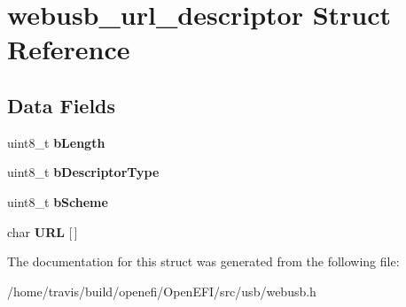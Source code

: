 \hypertarget{structwebusb__url__descriptor}{}\section{webusb\+\_\+url\+\_\+descriptor Struct Reference}
\label{structwebusb__url__descriptor}
\subsection*{Data Fields}
\begin{DoxyCompactItemize}
\item 
uint8\+\_\+t {\bfseries b\+Length}\hypertarget{structwebusb__url__descriptor_ab7745662fbfaa2dd39bfab51bc390d8c}{}\label{structwebusb__url__descriptor_ab7745662fbfaa2dd39bfab51bc390d8c}

\item 
uint8\+\_\+t {\bfseries b\+Descriptor\+Type}\hypertarget{structwebusb__url__descriptor_a52bd4b2085d6e379146dbc89413390e4}{}\label{structwebusb__url__descriptor_a52bd4b2085d6e379146dbc89413390e4}

\item 
uint8\+\_\+t {\bfseries b\+Scheme}\hypertarget{structwebusb__url__descriptor_a5a4ffe81a4930cc9ff5ff49d5539e4fd}{}\label{structwebusb__url__descriptor_a5a4ffe81a4930cc9ff5ff49d5539e4fd}

\item 
char {\bfseries U\+RL} \mbox{[}$\,$\mbox{]}\hypertarget{structwebusb__url__descriptor_a09a054c3d67753d6bd88eb02d0583ae2}{}\label{structwebusb__url__descriptor_a09a054c3d67753d6bd88eb02d0583ae2}

\end{DoxyCompactItemize}


The documentation for this struct was generated from the following file\+:\begin{DoxyCompactItemize}
\item 
/home/travis/build/openefi/\+Open\+E\+F\+I/src/usb/webusb.\+h\end{DoxyCompactItemize}
